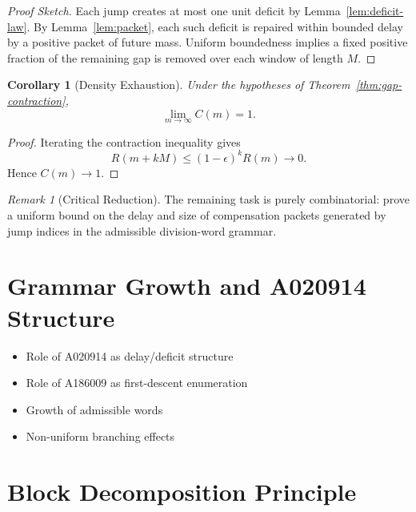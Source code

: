 \documentclass[12pt, oneside]{article}
\numberwithin{equation}{section}
\theoremstyle{definition}
\theoremstyle{plain}
\newtheorem{corollary}[theorem]{Corollary}
\theoremstyle{remark}
\newtheorem*{remark}{Remark}
\begin{document}
\begin{proof}[Proof Sketch]
Each jump creates at most one unit deficit by
Lemma~\ref{lem:deficit-law}. By Lemma~\ref{lem:packet}, each such deficit
is repaired within bounded delay by a positive packet of future mass.
Uniform boundedness implies a fixed positive fraction of the remaining
gap is removed over each window of length $M$.
\end{proof}


\begin{corollary}[Density Exhaustion]
\label{cor:density-exhaustion}
Under the hypotheses of Theorem~\ref{thm:gap-contraction},
\[
\lim_{m\to\infty} C(m)=1.
\]
\end{corollary}

\begin{proof}
Iterating the contraction inequality gives
\[
R(m+kM)\le (1-\epsilon)^kR(m)\to0.
\]
Hence $C(m)\to1$.
\end{proof}


\begin{remark}[Critical Reduction]
The remaining task is purely combinatorial: prove a uniform bound on the
delay and size of compensation packets generated by jump indices in the
admissible division-word grammar.
\end{remark}

\section{Grammar Growth and A020914 Structure}
\label{sec:8a-grammar}

\begin{itemize}
    \item Role of A020914 as delay/deficit structure
    \item Role of A186009 as first-descent enumeration
    \item Growth of admissible words
    \item Non-uniform branching effects
\end{itemize}

\section{Block Decomposition Principle}
\label{sec:8a-blocks}
\end{document}
